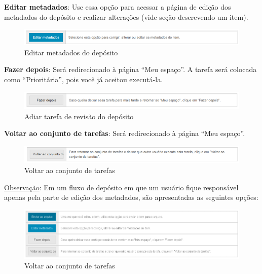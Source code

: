 \documentclass[12pt,hidelinks]{article}
\begin{document}
\newpage

    \textbf{Editar metadados}: Use essa opção para acessar a página de edição dos metadados do depósito e realizar alterações (vide seção descrevendo um item).
    
    \begin{figure}[!htp]
                \centering
                \includegraphics[scale=0.7]{figura/Figura175.png}
                \caption{Editar metadados do depósito}
            \label{Rotulo}
        \end{figure}
    
    \textbf{Fazer depois}: Será redirecionado à página “Meu espaço”. A tarefa será colocada como “Prioritária”, pois você já aceitou executá-la.
    
    \begin{figure}[!htp]
                \centering
                \includegraphics[scale=0.7]{figura/Figura176.png}
                \caption{Adiar tarefa de revisão do depósito}
            \label{Rotulo}
        \end{figure}
    
    \textbf{Voltar ao conjunto de tarefas}: Será redirecionado à página “Meu espaço”.
    
    \begin{figure}[!htp]
                \centering
                \includegraphics[scale=0.7]{figura/Figura177.png}
                \caption{Voltar ao conjunto de tarefas}
            \label{Rotulo}
        \end{figure}
    
    \underline{Observação}: Em um fluxo de depósito em que um usuário fique responsável apenas pela parte de edição dos metadados, são apresentadas as seguintes opções: 
    
    \begin{figure}[!htp]
                \centering
                \includegraphics[scale=0.7]{figura/Figura178.png}
                \caption{Voltar ao conjunto de tarefas}
            \label{Rotulo}
        \end{figure}
    
\end{document}
